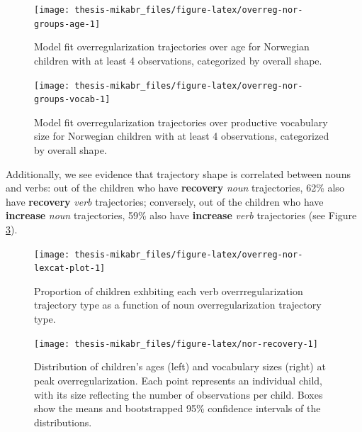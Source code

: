 \documentclass[
   11pt,
       ]{book}
\begin{document}
\begin{figure}

{\centering \texttt{[image: thesis-mikabr\_files/figure-latex/overreg-nor-groups-age-1]} 

}

\caption{Model fit overregularization trajectories over age for Norwegian children with at least 4 observations, categorized by overall shape.}\label{fig:overreg-nor-groups-age}
\end{figure}

\begin{figure}

{\centering \texttt{[image: thesis-mikabr\_files/figure-latex/overreg-nor-groups-vocab-1]} 

}

\caption{Model fit overregularization trajectories over productive vocabulary size for Norwegian children with at least 4 observations, categorized by overall shape.}\label{fig:overreg-nor-groups-vocab}
\end{figure}

Additionally, we see evidence that trajectory shape is correlated between nouns and verbs: out of the children who have \textbf{recovery} \emph{noun} trajectories, 62\% also have \textbf{recovery} \emph{verb} trajectories; conversely, out of the children who have \textbf{increase} \emph{noun} trajectories, 59\% also have \textbf{increase} \emph{verb} trajectories (see Figure \ref{fig:overreg-nor-lexcat-plot}).

\begin{figure}

{\centering \texttt{[image: thesis-mikabr\_files/figure-latex/overreg-nor-lexcat-plot-1]} 

}

\caption{Proportion of children exhbiting each verb overrregularization trajectory type as a function of noun overregularization trajectory type.}\label{fig:overreg-nor-lexcat-plot}
\end{figure}

\begin{figure}

{\centering \texttt{[image: thesis-mikabr\_files/figure-latex/nor-recovery-1]} 

}

\caption{Distribution of children's ages (left) and vocabulary sizes (right) at peak overregularization. Each point represents an individual child, with its size reflecting the number of observations per child. Boxes show the means and bootstrapped 95\% confidence intervals of the distributions.}\label{fig:nor-recovery}
\end{figure}
\end{document}
